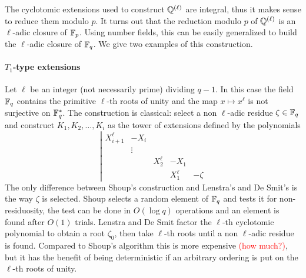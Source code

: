 \documentclass{sig-alternate}
\newcommand{\todo}[1]{\textcolor{red}{(#1)}}
\begin{document}
The cyclotomic extensions used to construct $\mathbb{Q}^{(\ell)}$ are
integral, thus it makes sense to reduce them modulo $p$. It turns out
that the reduction modulo $p$ of $\mathbb{Q}^{(\ell)}$ is an $\ell$-adic
closure of $\mathbb{F}_p$. Using number fields, this can be easily generalized
to build the $\ell$-adic closure of $\mathbb{F}_q$. We give two examples of
this construction.

\paragraph{$T_1$-type extensions}
Let $\ell$ be an integer (not necessarily prime) dividing $q-1$. In
this case the field $\mathbb{F}_q$ contains the primitive $\ell$-th roots of
unity and the map $x\mapsto x^{\ell}$ is not surjective on
$\mathbb{F}_q^\ast$. The construction is classical: select a non $\ell$-adic
residue $\zeta\in\mathbb{F}_q$ and construct $K_1,K_2,\dots,K_i$ as the tower
of extensions defined by the polynomials
\begin{equation}
  \label{eq:T1}
  \left|
  \begin{array}{rrrrr}
    X_{i+1}^\ell &- X_i\\
    &\vdots\\
    &&X_2^\ell &- X_1\\
              &&&X_1^\ell &- \zeta
  \end{array}
  \right.
\end{equation}
The only difference between Shoup's construction and Lenstra's and De
Smit's is the way $\zeta$ is selected. Shoup selects a random element
of $\mathbb{F}_q$ and tests it for non-residuosity, the test can be done in
$O(\log q)$ operations and an element is found after $O(1)$
trials. Lenstra and De Smit factor the $\ell$-th cyclotomic polynomial
to obtain a root $\zeta_0$, then take $\ell$-th roots until a non
$\ell$-adic residue is found. Compared to Shoup's algorithm this is
more expensive \todo{how much?}, but it has the benefit of being
deterministic if an arbitrary ordering is put on the $\ell$-th roots
of unity.
\end{document}
